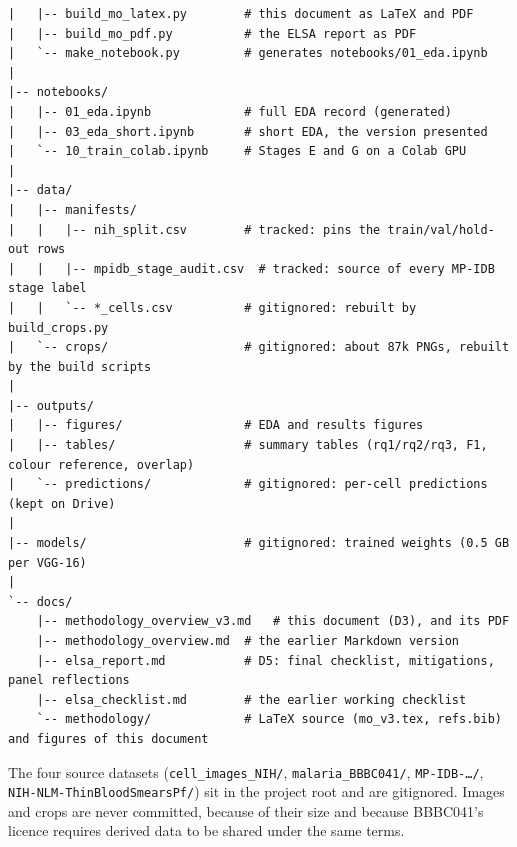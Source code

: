 \documentclass[11pt,a4paper]{article}
\begin{document}
\begin{Verbatim}[fontsize=\fontsize{6.5}{8}\selectfont,frame=none]
|   |-- build_mo_latex.py        # this document as LaTeX and PDF
|   |-- build_mo_pdf.py          # the ELSA report as PDF
|   `-- make_notebook.py         # generates notebooks/01_eda.ipynb
|
|-- notebooks/
|   |-- 01_eda.ipynb             # full EDA record (generated)
|   |-- 03_eda_short.ipynb       # short EDA, the version presented
|   `-- 10_train_colab.ipynb     # Stages E and G on a Colab GPU
|
|-- data/
|   |-- manifests/
|   |   |-- nih_split.csv        # tracked: pins the train/val/hold-out rows
|   |   |-- mpidb_stage_audit.csv  # tracked: source of every MP-IDB stage label
|   |   `-- *_cells.csv          # gitignored: rebuilt by build_crops.py
|   `-- crops/                   # gitignored: about 87k PNGs, rebuilt by the build scripts
|
|-- outputs/
|   |-- figures/                 # EDA and results figures
|   |-- tables/                  # summary tables (rq1/rq2/rq3, F1, colour reference, overlap)
|   `-- predictions/             # gitignored: per-cell predictions (kept on Drive)
|
|-- models/                      # gitignored: trained weights (0.5 GB per VGG-16)
|
`-- docs/
    |-- methodology_overview_v3.md   # this document (D3), and its PDF
    |-- methodology_overview.md  # the earlier Markdown version
    |-- elsa_report.md           # D5: final checklist, mitigations, panel reflections
    |-- elsa_checklist.md        # the earlier working checklist
    `-- methodology/             # LaTeX source (mo_v3.tex, refs.bib) and figures of this document
\end{Verbatim}

The four source datasets (\texttt{cell\_\allowbreak{}images\_\allowbreak{}NIH/\allowbreak{}}, \texttt{malaria\_\allowbreak{}BBBC041/\allowbreak{}}, \texttt{MP-IDB-…/\allowbreak{}}, \texttt{NIH-NLM-ThinBloodSmearsPf/\allowbreak{}}) sit in the project root and are gitignored. Images and crops are never committed, because of their size and because BBBC041's licence requires derived data to be shared under the same terms.
\end{document}
